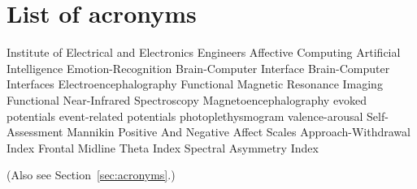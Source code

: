 \chapter{List of acronyms}

\begin{acronym}[TDMAAA]
					{Institute of Electrical and Electronics Engineers}
					{Affective Computing}	
					{Artificial Intelligence}
    			   {Emotion-Recognition}
    			   {Brain-Computer Interface}
    			   {Brain-Computer Interfaces}
    			   {Electroencephalography}
               {Functional Magnetic Resonance Imaging}
              {Functional Near-Infrared Spectroscopy}
               {Magnetoencephalography}
               {evoked potentials}
    		  {event-related potentials}
            {photoplethysmogram}
            {valence-arousal}
    		{Self-Assessment Mannikin}
    		{Positive And Negative Affect Scales}
    		{Approach-Withdrawal Index}
    		{Frontal Midline Theta Index}
    		{Spectral Asymmetry Index}

\end{acronym}

\noindent (Also see Section~\ref{sec:acronyms}.)